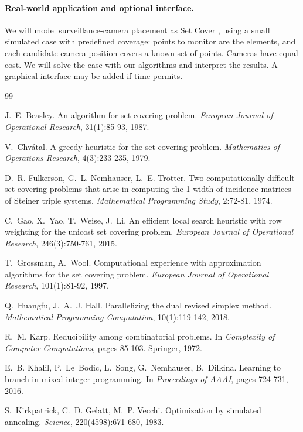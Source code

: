 \documentclass[a4paper,11pt]{article}
\begin{document}
\paragraph{Real-world application and optional interface.} We will model surveillance-camera placement as Set Cover \cite{kritter2019}, using a small simulated case with predefined coverage: points to monitor are the elements, and each candidate camera position covers a known set of points. Cameras have equal cost. We will solve the case with our algorithms and interpret the results. A graphical interface may be added if time permits.

\begin{thebibliography}{99}
\small
\setlength{\itemsep}{1pt}

 J.~E. Beasley. An algorithm for set covering problem. \emph{European Journal of Operational Research}, 31(1):85-93, 1987.

 V.~Chvátal. A greedy heuristic for the set-covering problem. \emph{Mathematics of Operations Research}, 4(3):233-235, 1979.

 D.~R. Fulkerson, G.~L. Nemhauser, L.~E. Trotter. Two computationally difficult set covering problems that arise in computing the 1-width of incidence matrices of Steiner triple systems. \emph{Mathematical Programming Study}, 2:72-81, 1974.

 C.~Gao, X.~Yao, T.~Weise, J.~Li. An efficient local search heuristic with row weighting for the unicost set covering problem. \emph{European Journal of Operational Research}, 246(3):750-761, 2015.

 T.~Grossman, A.~Wool. Computational experience with approximation algorithms for the set covering problem. \emph{European Journal of Operational Research}, 101(1):81-92, 1997.

 Q.~Huangfu, J.~A.~J. Hall. Parallelizing the dual revised simplex method. \emph{Mathematical Programming Computation}, 10(1):119-142, 2018.

 R.~M. Karp. Reducibility among combinatorial problems. In \emph{Complexity of Computer Computations}, pages 85-103. Springer, 1972.

 E.~B. Khalil, P.~Le~Bodic, L.~Song, G.~Nemhauser, B.~Dilkina. Learning to branch in mixed integer programming. In \emph{Proceedings of AAAI}, pages 724-731, 2016.

 S.~Kirkpatrick, C.~D. Gelatt, M.~P. Vecchi. Optimization by simulated annealing. \emph{Science}, 220(4598):671-680, 1983.


\end{thebibliography}
\end{document}
